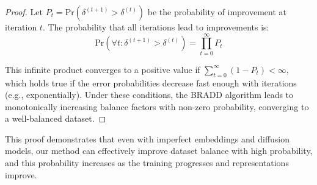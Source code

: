 \begin{proof}
\noindent
Let $P_t = \mathrm{Pr}(\delta^{(t+1)} > \delta^{(t)})$ be the probability of improvement at iteration $t$. The probability that all iterations lead to improvements is:
\begin{equation}
\mathrm{Pr}(\forall t: \delta^{(t+1)} > \delta^{(t)}) = \prod_{t=0}^{\infty} P_t
\end{equation}

\noindent
This infinite product converges to a positive value if $\sum_{t=0}^{\infty} (1 - P_t) < \infty$, which holds true if the error probabilities decrease fast enough with iterations (e.g., exponentially). Under these conditions, the BRADD algorithm leads to monotonically increasing balance factors with non-zero probability, converging to a well-balanced dataset.
\end{proof}

\noindent
This proof demonstrates that even with imperfect embeddings and diffusion models, our method can effectively improve dataset balance with high probability, and this probability increases as the training progresses and representations improve.
